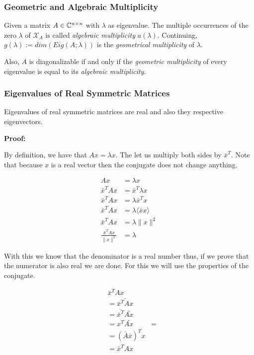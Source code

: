 \subsubsection{Geometric and Algebraic Multiplicity}

Given a matrix \(A \in \mathbb{C}^{n \times n}\) with \(\lambda\) as eigenvalue. The multiple occurrences 
of the zero \(\lambda\) of \(\mathcal{X}_A\) is called \emph{algebraic multiplicity} \(a(\lambda)\). 
Continuing, \(g(\lambda):= dim(Eig(A;\lambda))\) is the \emph{geometrical multiplicity} of \(\lambda\).

Also, \(A\) is diagonalizable if and only if the \emph{geometric multiplicity} of every eigenvalue is equal 
to its \emph{algebraic multiplicity}.

\subsubsection{Eigenvalues of Real Symmetric Matrices}

Eigenvalues of real symmetric matrices are real and also they respective eigenvectors.

\textbf{Proof:}

By definition, we have that \(Ax = \lambda x\). The let us multiply both sides by \( \bar{x}^T\). Note 
that because \(x\) is a real vector then the conjugate does not change anything.

\begin{align*}
    Ax &= \lambda x \\
    \bar{x}^T A x &= \bar{x}^T \lambda x \\
    \bar{x}^T A x &= \lambda \bar{x}^T x \\
    \bar{x}^T A x &= \lambda \langle \bar{x} x \rangle\\
    \bar{x}^T A x &= \lambda \|x\|^2\\
    \frac{\bar{x}^T A x}{\|x\|^2} &= \lambda
\end{align*}

With this we know that the denominator is a real number thus, if we prove that the numerator is also real 
we are done. For this we will use the properties of the conjugate.

\begin{align*}
    &\bar{x}^T A x\\
    &=\bar{\bar{x}^T A x} \\
    &=\bar{\bar{x}^T} \bar{Ax} \\
    &=x^T \bar{Ax} &= \\
    &=(\bar{A}\bar{x})^T x \\
    &=\bar{x}^T A  x 
\end{align*}

